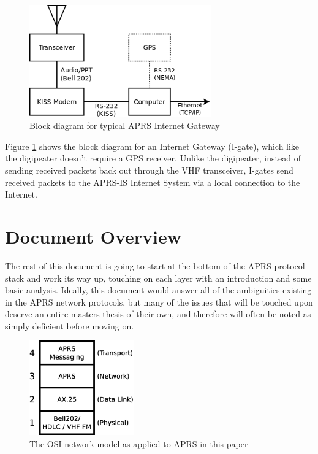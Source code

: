 \begin{figure}
	\centering
	\includegraphics[width=0.7\textwidth]{src/dia/igate_kiss}
	\caption{Block diagram for typical APRS Internet Gateway}
	\label{fig:blockigate}
\end{figure}

Figure \ref{fig:blockigate} shows the block diagram for
an Internet Gateway (I-gate), which
like the digipeater doesn't require a GPS receiver. Unlike the digipeater,
instead of sending received packets back out through the VHF transceiver,
I-gates send received packets to the APRS-IS Internet System via a local connection
to the Internet.


\section{Document Overview}

The rest of this document is going to start at the bottom of the APRS protocol
stack and work its way up, touching on each layer with an introduction and
some basic analysis. 
Ideally, this document would answer all of the ambiguities existing in the
APRS network protocols, but many of the issues that will be touched upon 
deserve an entire masters thesis of their own, and therefore will often
be noted as simply deficient before moving on.

\begin{figure}
	\centering
	\includegraphics[width=0.4\textwidth]{src/dia/osi_full}
	\caption{The OSI network model as applied to APRS in this paper}
	\label{fig:osiaprs}
\end{figure}

